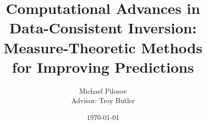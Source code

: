 \documentclass[10pt]{beamer}
\author{Michael Pilosov\\ \vskip 5pt{Advisor: Troy Butler}}%
\title[CG]{Computational Advances in\\Data-Consistent Inversion:\\Measure-Theoretic Methods\\for Improving Predictions}
\institute{University of Colorado Denver}
\date{\today}
\begin{document}
\begin{frame}[t,plain]
    \titlepage
\end{frame}








% 
% 









\end{document}
